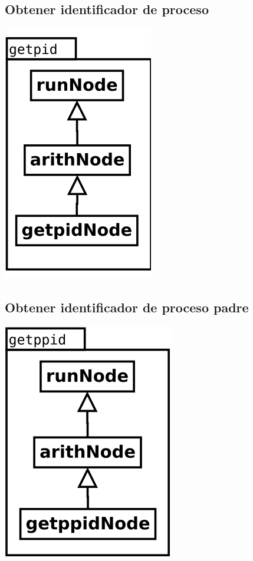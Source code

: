 \subsection {Obtener identificador de proceso} 
\begin{center}
\includegraphics[scale=0.4]{getpid.png} \\
\end{center}

\subsection {Obtener identificador de proceso padre} 
\begin{center}
\includegraphics[scale=0.4]{getppid.png} \\
\end{center}

